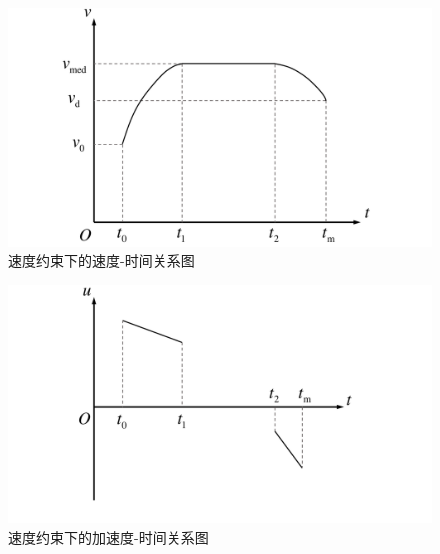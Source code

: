 \begin{figure}[htbp]
\centering
\includegraphics[width=12cm]{figures/vc.pdf}
\caption{速度约束下的速度-时间关系图}
\label{fig:vc}
\end{figure}
\begin{figure}[htbp]
\centering
\includegraphics[width=12cm]{figures/vcu.pdf}
\caption{速度约束下的加速度-时间关系图}
\label{fig:vcu}
\end{figure}


